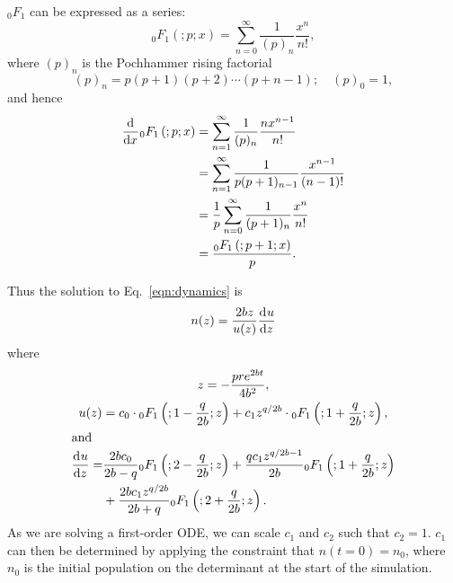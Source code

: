 \documentclass[a4paper, 11pt]{article}
\newcommand{\dd}[3][\null]{\frac{\mathrm{d}^{#1}{#2}}{\mathrm{d}{#3}^{#1}}}
\newcommand{\hyperF}[2]{{_0}F_1\left(;#1;#2\right)}
\begin{document}
${_0}F_1$ can be expressed as a series:
\begin{equation}
\hyperF{p}{x} = \sum_{n=0}^{\infty} \frac{1}{(p)_n} \frac{x^n}{n!},
\end{equation}
where $(p)_n$ is the Pochhammer rising factorial
\begin{equation}
(p)_n = p(p+1)(p+2)\cdots(p+n-1); \quad (p)_0 = 1,
\end{equation}
and hence
\begin{align}
\dd{\null}{x} \hyperF{p}{x} &= \sum_{n=1}^{\infty} \frac{1}{(p)_n} \frac{n x^{n-1}}{n!} \\
                            &= \sum_{n=1}^{\infty} \frac{1}{p(p+1)_{n-1}} \frac{x^{n-1}}{(n-1)!} \\
                            &= \frac{1}{p} \sum_{n=0}^{\infty} \frac{1}{(p+1)_n} \frac{x^n}{n!} \\
                            &= \frac{\hyperF{p+1}{x}}{p}.
\end{align}

Thus the solution to Eq.~\ref{eqn:dynamics} is 
\begin{equation}
n(z) = \frac{2bz}{u(z)}\dd{u}{z}
\end{equation}
where
\begin{gather}
z = -\frac{pre^{2bt}}{4b^2}, \\
u(z) = c_0\cdot\hyperF{1-\frac{q}{2b}}{z} + c_1 z^{q/2b}\cdot\hyperF{1+\frac{q}{2b}}{z}, \\
\intertext{and}
\begin{split}
\dd{u}{z} = &\frac{2bc_0}{2b-q}\hyperF{2-\frac{q}{2b}}{z} + \frac{q c_1 z^{q/2b-1}}{2b}\hyperF{1+\frac{q}{2b}}{z} \\ &+ \frac{2bc_1z^{q/2b}}{2b+q}\hyperF{2+\frac{q}{2b}}{z}.
\end{split}
\end{gather}
As we are solving a first-order ODE, we can scale $c_1$ and $c_2$ such that $c_2=1$.  $c_1$ can then be determined by applying the constraint that $n(t=0)=n_0$, where $n_0$ is the initial population on the determinant at the start of the simulation.
\end{document}
